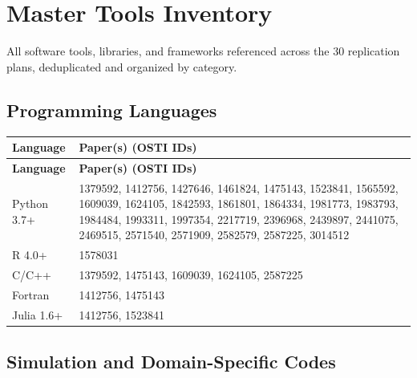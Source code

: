 \documentclass[11pt,a4paper]{article}
\begin{document}
\newpage
\section{Master Tools Inventory}
\label{sec:tools}

All software tools, libraries, and frameworks referenced across the 30 replication plans, deduplicated and organized by category.

\subsection{Programming Languages}

\begin{longtable}{l p{9cm}}
\toprule
\textbf{Language} & \textbf{Paper(s) (OSTI IDs)} \\
\midrule
\endfirsthead
\toprule
\textbf{Language} & \textbf{Paper(s) (OSTI IDs)} \\
\midrule
\endhead
Python 3.7+ & 1379592, 1412756, 1427646, 1461824, 1475143, 1523841, 1565592, 1609039, 1624105, 1842593, 1861801, 1864334, 1981773, 1983793, 1984484, 1993311, 1997354, 2217719, 2396968, 2439897, 2441075, 2469515, 2571540, 2571909, 2582579, 2587225, 3014512 \\
\midrule
R 4.0+ & 1578031 \\
\midrule
C/C++ & 1379592, 1475143, 1609039, 1624105, 2587225 \\
\midrule
Fortran & 1412756, 1475143 \\
\midrule
Julia 1.6+ & 1412756, 1523841 \\
\bottomrule
\end{longtable}


\subsection{Simulation and Domain-Specific Codes}
\end{document}
